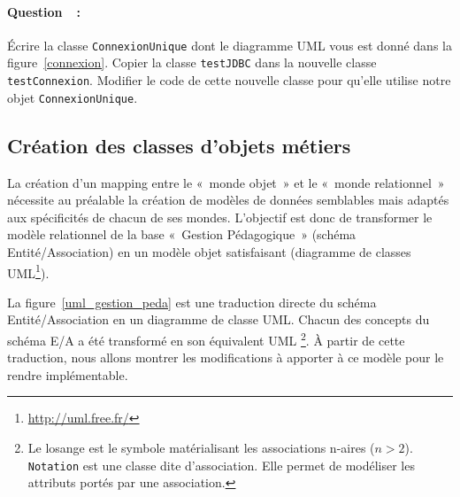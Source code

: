 \documentclass[a4paper,11pt]{article}
\newcounter{compteurQuestion}
\newcommand{\Question}{\paragraph*{Question~\thecompteurQuestion~:}\addtocounter{compteurQuestion}{1}}
\begin{document}
\Question
Écrire la classe \texttt{ConnexionUnique} dont le diagramme UML vous est donné dans la figure~\ref{connexion}.
Copier la classe \texttt{testJDBC} dans la nouvelle classe \texttt{testConnexion}.
Modifier le code de cette nouvelle classe pour qu'elle utilise notre objet \texttt{ConnexionUnique}.

\subsection{Création des classes d'objets métiers}
La création d'un mapping entre le «~monde objet~» et le «~monde relationnel~» nécessite au préalable la création de 
modèles de données semblables mais adaptés aux spécificités de chacun de ses mondes.  L'objectif est donc de transformer 
le modèle relationnel de la base «~Gestion Pédagogique~» (schéma Entité/Association)  en un modèle objet satisfaisant 
(diagramme de classes UML\footnote{\url{http://uml.free.fr/}}).

La figure~\ref{uml_gestion_peda} est une traduction directe du schéma Entité/Association en un  diagramme de classe UML. 
Chacun des concepts du schéma E/A a été transformé en son équivalent UML \footnote{Le losange est le symbole 
matérialisant les associations n-aires ($n > 2$). \texttt{Notation} est une classe dite d'association. Elle permet de 
modéliser les attributs portés par une association.}. À partir de cette traduction, nous allons montrer les 
modifications à apporter à ce modèle pour le rendre implémentable.
\end{document}
